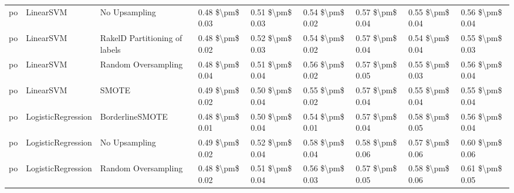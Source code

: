 \begin{tabular}{lllllllll}
      po &                       LinearSVM &                 No Upsampling & 0.48 \$\textbackslash pm\$ 0.03 &           0.51 \$\textbackslash pm\$ 0.03 &       0.54 \$\textbackslash pm\$ 0.02 &        0.57 \$\textbackslash pm\$ 0.04 &                         0.55 \$\textbackslash pm\$ 0.04 &     0.56 \$\textbackslash pm\$ 0.04 \\
      po &                       LinearSVM & RakelD Partitioning of labels & 0.48 \$\textbackslash pm\$ 0.02 &           0.52 \$\textbackslash pm\$ 0.03 &       0.54 \$\textbackslash pm\$ 0.02 &        0.57 \$\textbackslash pm\$ 0.04 &                         0.54 \$\textbackslash pm\$ 0.04 &     0.55 \$\textbackslash pm\$ 0.03 \\
      po &                       LinearSVM &           Random Oversampling & 0.48 \$\textbackslash pm\$ 0.04 &           0.51 \$\textbackslash pm\$ 0.04 &       0.56 \$\textbackslash pm\$ 0.02 &        0.57 \$\textbackslash pm\$ 0.05 &                         0.55 \$\textbackslash pm\$ 0.03 &     0.56 \$\textbackslash pm\$ 0.04 \\
      po &                       LinearSVM &                         SMOTE & 0.49 \$\textbackslash pm\$ 0.02 &           0.50 \$\textbackslash pm\$ 0.04 &       0.55 \$\textbackslash pm\$ 0.02 &        0.57 \$\textbackslash pm\$ 0.04 &                         0.55 \$\textbackslash pm\$ 0.04 &     0.55 \$\textbackslash pm\$ 0.04 \\
      po &              LogisticRegression &               BorderlineSMOTE & 0.48 \$\textbackslash pm\$ 0.01 &           0.50 \$\textbackslash pm\$ 0.04 &       0.54 \$\textbackslash pm\$ 0.01 &        0.57 \$\textbackslash pm\$ 0.04 &                         0.58 \$\textbackslash pm\$ 0.05 &     0.56 \$\textbackslash pm\$ 0.04 \\
      po &              LogisticRegression &                 No Upsampling & 0.49 \$\textbackslash pm\$ 0.02 &           0.52 \$\textbackslash pm\$ 0.04 &       0.58 \$\textbackslash pm\$ 0.04 &        0.58 \$\textbackslash pm\$ 0.06 &                         0.57 \$\textbackslash pm\$ 0.06 &     0.60 \$\textbackslash pm\$ 0.06 \\
      po &              LogisticRegression &           Random Oversampling & 0.48 \$\textbackslash pm\$ 0.02 &           0.51 \$\textbackslash pm\$ 0.04 &       0.56 \$\textbackslash pm\$ 0.03 &        0.57 \$\textbackslash pm\$ 0.05 &                         0.58 \$\textbackslash pm\$ 0.06 &     0.61 \$\textbackslash pm\$ 0.05 \\

\end{tabular}

